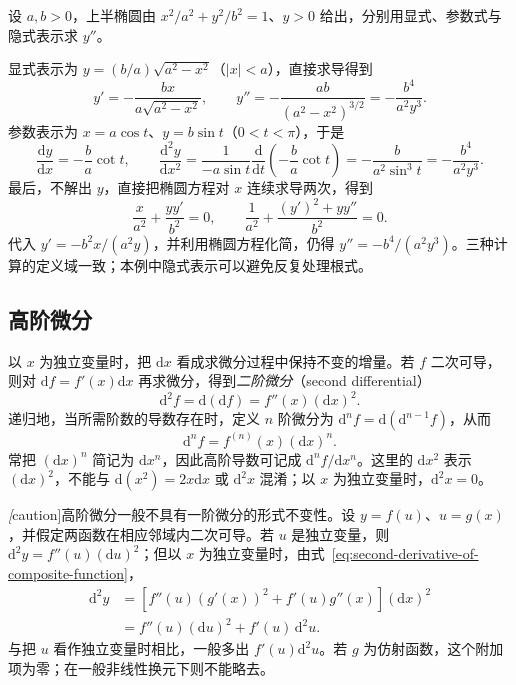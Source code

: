 \documentclass[UTF8,12pt,a4paper,fontset=fandol]{ctexbook}
\begin{document}
\begin{example}
\label{ex:ellipse-second-derivative-three-methods}
设 $a,b>0$，上半椭圆由 $x^2/a^2+y^2/b^2=1$、$y>0$ 给出，分别用显式、参数式与隐式表示求 $y''$。
\end{example}
\begin{solve}
显式表示为 $y=(b/a)\sqrt{a^2-x^2}$（$|x|<a$），直接求导得到
\[
    y'=-\frac{bx}{a\sqrt{a^2-x^2}},\qquad
    y''=-\frac{ab}{(a^2-x^2)^{3/2}}
        =-\frac{b^4}{a^2y^3}.
\]
参数表示为 $x=a\cos t$、$y=b\sin t$（$0<t<\pi$），于是
\[
    \frac{\mathrm dy}{\mathrm dx}=-\frac ba\cot t,\qquad
    \frac{\mathrm d^2y}{\mathrm dx^2}
    =\frac1{-a\sin t}\frac{\mathrm d}{\mathrm dt}
      \left(-\frac ba\cot t\right)
    =-\frac b{a^2\sin^3t}
    =-\frac{b^4}{a^2y^3}.
\]
最后，不解出 $y$，直接把椭圆方程对 $x$ 连续求导两次，得到
\[
    \frac x{a^2}+\frac{yy'}{b^2}=0,\qquad
    \frac1{a^2}+\frac{(y')^2+yy''}{b^2}=0.
\]
代入 $y'=-b^2x/(a^2y)$，并利用椭圆方程化简，仍得 $y''=-b^4/(a^2y^3)$。三种计算的定义域一致；本例中隐式表示可以避免反复处理根式。
\end{solve}

\subsection{高阶微分}
\label{subsec:higher-differentials}

以 $x$ 为独立变量时，把 $\mathrm dx$ 看成求微分过程中保持不变的增量。若 $f$ 二次可导，则对 $\mathrm df=f'(x)\mathrm dx$ 再求微分，得到\emph{二阶微分}（second differential）
\[
    \mathrm d^2f=\mathrm d(\mathrm df)=f''(x)(\mathrm dx)^2.
\]
递归地，当所需阶数的导数存在时，定义 $n$ 阶微分为 $\mathrm d^nf=\mathrm d(\mathrm d^{n-1}f)$，从而
\begin{equation}
\label{eq:higher-differentials-independent-variable}
    \mathrm d^nf=f^{(n)}(x)(\mathrm dx)^n.
\end{equation}
常把 $(\mathrm dx)^n$ 简记为 $\mathrm dx^n$，因此高阶导数可记成 $\mathrm d^nf/\mathrm dx^n$。这里的 $\mathrm dx^2$ 表示 $(\mathrm dx)^2$，不能与 $\mathrm d(x^2)=2x\mathrm dx$ 或 $\mathrm d^2x$ 混淆；以 $x$ 为独立变量时，$\mathrm d^2x=0$。

\emph[caution]{高阶微分一般不具有一阶微分的形式不变性。}设 $y=f(u)$、$u=g(x)$，并假定两函数在相应邻域内二次可导。若 $u$ 是独立变量，则 $\mathrm d^2y=f''(u)(\mathrm du)^2$；但以 $x$ 为独立变量时，由式~\eqref{eq:second-derivative-of-composite-function}，
\begin{equation}
\label{eq:second-differential-dependent-inner-variable}
\begin{aligned}
    \mathrm d^2y
    &=\left[f''(u)(g'(x))^2+f'(u)g''(x)\right](\mathrm dx)^2\\
    &=f''(u)(\mathrm du)^2+f'(u)\,\mathrm d^2u.
\end{aligned}
\end{equation}
与把 $u$ 看作独立变量时相比，一般多出 $f'(u)\mathrm d^2u$。若 $g$ 为仿射函数，这个附加项为零；在一般非线性换元下则不能略去。
\end{document}
